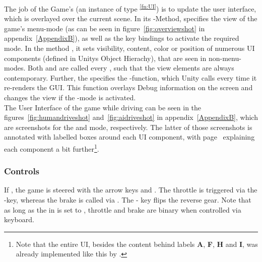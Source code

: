 The job of the Game's  (an instance of type \textsuperscript{\ref{fn:UI}}) is to update the user interface, which is overlayed over the current scene. In its -Method,  specifies the view of the game's menu-mode (as can be seen in figure~\ref{fig:overviewshot} in appendix~\ref{AppendixB}), as well as the key bindings to activate the required mode. In the method , it sets visibility, content, color or position of numerous UI components (defined in Unitys Object Hierachy), that are seen in non-menu-modes. Both  and  are called every , such that the view elements are always contemporary. Further, the  specifies the -function, which Unity calls every time it re-renders the GUI. This function overlays Debug information on the screen and changes the view if the -mode is activated.\\

\noindent The User Interface of the game while driving can be seen in the figures~\ref{fig:humandriveshot} and~\ref{fig:aidriveshot} in appendix~\ref{AppendixB}, which are screenshots for the  and  mode, respectively. The latter of those screenshots is annotated with labelled boxes around each UI component, with page~\pageref{fig:aidriveshot} explaining each component a bit further\footnote{Note that the entire UI, besides the content behind labels \textbf{A}, \textbf{F}, \textbf{H} and \textbf{I}, was already implemented like this by \leon.}.

\subsubsection{Controls}

If , the game is steered with the arrow keys \keystroke{$\leftarrow$} and \mbox{\keystroke{$\rightarrow$}.} The throttle is triggered via the -key, whereas the brake is called via . The  - key flips the reverse gear. Note that as long as the  in  is set to , throttle and brake are binary when controlled via keyboard. 

